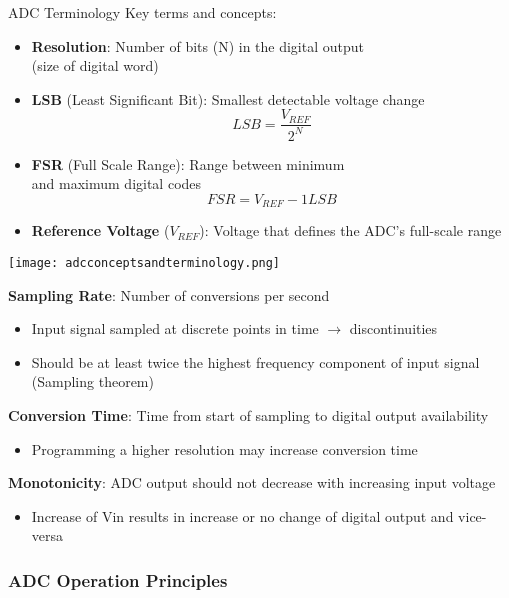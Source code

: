 \begin{theorem}{ADC Terminology}
Key terms and concepts:

\begin{minipage}{0.6\linewidth}
\begin{itemize}
    \item \textbf{Resolution}: Number of bits (N) in the digital output\\ (size of digital word)
    \item \textbf{LSB} (Least Significant Bit): Smallest detectable voltage change
    $$LSB = \frac{V_{REF}}{2^N}$$
    \item \textbf{FSR} (Full Scale Range): Range between minimum \\ and maximum digital codes
    $$FSR = V_{REF} - 1 LSB$$
    \item \textbf{Reference Voltage} ($V_{REF}$): Voltage that defines the ADC's full-scale range
\end{itemize}
\end{minipage}
\begin{minipage}{0.4\linewidth}
    \texttt{[image: adcconceptsandterminology.png]}
\end{minipage}

\textbf{Sampling Rate}: Number of conversions per second
\begin{itemize}
    \item Input signal sampled at discrete points in time $\rightarrow$ discontinuities
    \item Should be at least twice the highest frequency component of input signal (Sampling theorem)
\end{itemize}
\textbf{Conversion Time}: Time from start of sampling to digital output availability
\begin{itemize}
    \item Programming a higher resolution may increase conversion time
\end{itemize}
\textbf{Monotonicity}: ADC output should not decrease with increasing input voltage
\begin{itemize}
    \item Increase of Vin results in increase or no change of digital output and vice-versa
\end{itemize}
\end{theorem}

\subsubsection{ADC Operation Principles}

